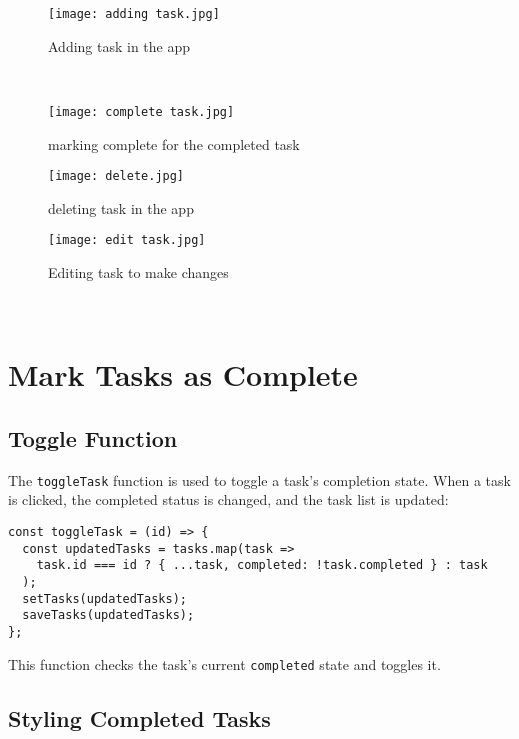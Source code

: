\documentclass{article}
\begin{document}
\begin{figure}[htbp]
    \centering
    \texttt{[image: adding task.jpg]}
    \caption{Adding task in the app}
    \label{fig:enter-label}
\end{figure}\\

\begin{figure}[htbp]
    \centering
    \texttt{[image: complete task.jpg]}
    \caption{marking complete for the completed task}
    \label{fig:enter-label}
\end{figure}

\begin{figure}[htbp]
    \centering
    \texttt{[image: delete.jpg]}
    \caption{deleting task in the app }
    \label{fig:enter-label}
\end{figure}

\begin{figure}[htbp]
    \centering
    \texttt{[image: edit task.jpg]}
    \caption{Editing task to make changes }
    \label{fig:enter-label}
\end{figure}\\

\section*{Mark Tasks as Complete}



\subsection*{Toggle Function}

The \texttt{toggleTask} function is used to toggle a task's completion state. When a task is clicked, the completed status is changed, and the task list is updated:

\begin{verbatim}
const toggleTask = (id) => {
  const updatedTasks = tasks.map(task =>
    task.id === id ? { ...task, completed: !task.completed } : task
  );
  setTasks(updatedTasks);
  saveTasks(updatedTasks);
};
\end{verbatim}

This function checks the task's current \texttt{completed} state and toggles it.

\subsection*{Styling Completed Tasks}
\end{document}
